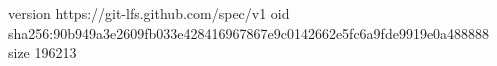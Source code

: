 version https://git-lfs.github.com/spec/v1
oid sha256:90b949a3e2609fb033e428416967867e9c0142662e5fc6a9fde9919e0a488888
size 196213

